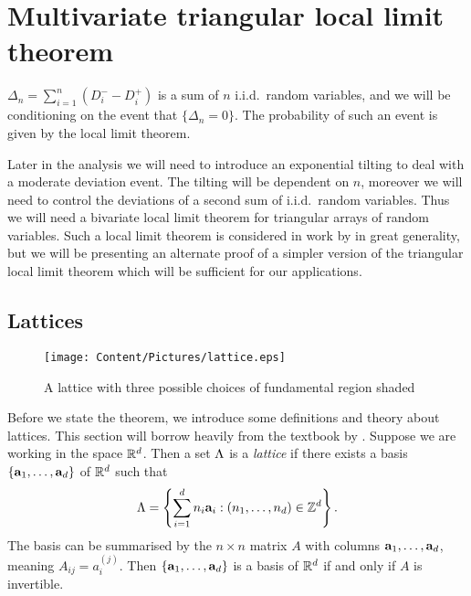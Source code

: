 \section{Multivariate triangular local limit theorem}
\label{sec:llt}

$\Delta_n = \sum_{i=1}^n (D_i^- - D_i^+)$ is a sum of $n$ i.i.d.\ random variables, and we will be conditioning on the event that $\{\Delta_n = 0\}$. The probability of such an event is given by the local limit theorem.

Later in the analysis we will need to introduce an exponential tilting to deal with a moderate deviation event. The tilting will be dependent on $n$, moreover we will need to control the deviations of a second sum of i.i.d.\ random variables. Thus we will need a bivariate local limit theorem for triangular arrays of random variables. Such a local limit theorem is considered in work by  in great generality, but we will be presenting an alternate proof of a simpler version of the triangular local limit theorem which will be sufficient for our applications.

\subsection{Lattices}

\begin{figure}[htbp]
    \centering
    \texttt{[image: Content/Pictures/lattice.eps]}
    \caption{A lattice with three possible choices of fundamental region shaded}
    \label{fig:lattice}
\end{figure}

Before we state the theorem, we introduce some definitions and theory about lattices. This section will borrow heavily from the textbook by \citet{schrijverTheoryLinearInteger1998}. Suppose we are working in the space ${\mathbb R}^d$. Then a set $\Lambda$ is a \emph{lattice} if there exists a basis $\{{\mathbf a}_1, \ldots, {\mathbf a}_d\}$ of ${\mathbb R}^d$ such that
\begin{equation*}
    \Lambda = \left\{ \sum_{i=1}^d n_i {\mathbf a}_i : (n_1, \ldots, n_d) \in {\mathbb Z}^d \right\}.
\end{equation*}
The basis can be summarised by the $n \times n$ matrix $A$ with columns ${\mathbf a}_1, \ldots, {\mathbf a}_d$, meaning $A_{ij} = a_i^{(j)}$. Then $\{{\mathbf a}_1, \ldots, {\mathbf a}_d\}$ is a basis of ${\mathbb R}^d$ if and only if $A$ is invertible. 

